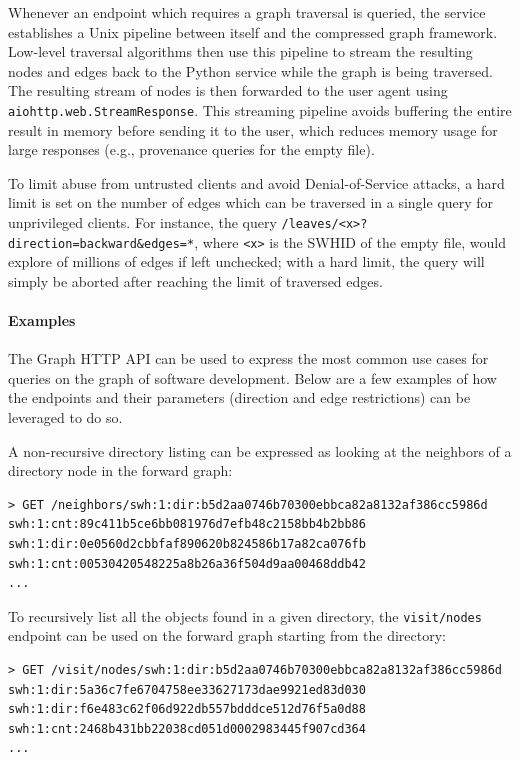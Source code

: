 Whenever an endpoint which requires a graph traversal is queried, the service
establishes a Unix pipeline between itself and the compressed graph framework.
Low-level traversal algorithms then use this pipeline to stream the resulting
nodes and edges back to the Python service while the graph is being traversed.
The resulting stream of nodes is then forwarded to the user agent using
\texttt{aiohttp.web.StreamResponse}. This streaming pipeline avoids buffering
the entire result in memory before sending it to the user, which reduces memory
usage for large responses (e.g., provenance queries for the empty file).

To limit abuse from untrusted clients and avoid Denial-of-Service attacks, a
hard limit is set on the number of edges which can be traversed in a single
query for unprivileged clients. For instance, the query
\texttt{/leaves/<x>?direction=backward\&edges=*}, where \texttt{<x>} is the
\gls{SWHID} of the empty file, would explore of millions of edges if left
unchecked; with a hard limit, the query will simply be aborted after reaching
the limit of traversed edges.

\paragraph{Examples}

The Graph HTTP API can be used to express the most common use cases for queries
on the graph of software development. Below are a few examples of how the
endpoints and their parameters (direction and edge restrictions) can be
leveraged to do so.

A non-recursive directory listing can be expressed as looking at the neighbors
of a directory node in the forward graph:

\begin{verbatim}
> GET /neighbors/swh:1:dir:b5d2aa0746b70300ebbca82a8132af386cc5986d
swh:1:cnt:89c411b5ce6bb081976d7efb48c2158bb4b2bb86
swh:1:dir:0e0560d2cbbfaf890620b824586b17a82ca076fb
swh:1:cnt:00530420548225a8b26a36f504d9aa00468ddb42
...
\end{verbatim}

To recursively list all the objects found in a given directory, the
\texttt{visit/nodes} endpoint can be used on the forward graph starting from
the directory:

\begin{verbatim}
> GET /visit/nodes/swh:1:dir:b5d2aa0746b70300ebbca82a8132af386cc5986d
swh:1:dir:5a36c7fe6704758ee33627173dae9921ed83d030
swh:1:dir:f6e483c62f06d922db557bdddce512d76f5a0d88
swh:1:cnt:2468b431bb22038cd051d0002983445f907cd364
...
\end{verbatim}

